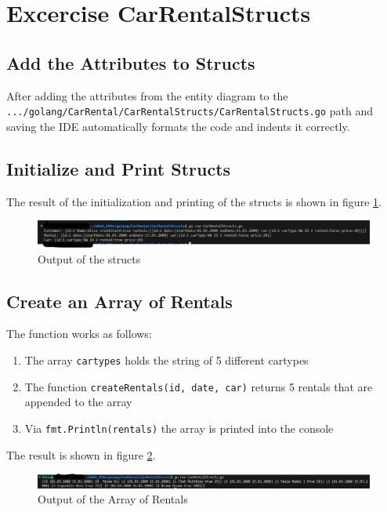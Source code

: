 \section{Excercise CarRentalStructs}
\label{sec:car_rental_structs}

\subsection*{Add the Attributes to Structs}
After adding the attributes from the entity diagram to the 
\texttt{.../golang/CarRental/CarRentalStructs/CarRentalStructs.go} path and saving
the IDE automatically formats the code and indents it correctly.

\subsection*{Initialize and Print Structs}
The result of the initialization and printing of the structs is shown in figure \ref{fig:car_rental_structs}.
\begin{figure}[H]
    \centering
    \includegraphics[width=\textwidth]{figures/goLang/carRental/carRental_structs.png}
    \caption{Output of the structs}
    \label{fig:car_rental_structs}
\end{figure}

\subsection*{Create an Array of Rentals}
The function works as follows:
\begin{enumerate}
    \item The array \texttt{cartypes} holds the string of 5 different cartypes
    \item The function \texttt{createRentals(id, date, car)} returns 5 rentals that are appended to the array
    \item Via \texttt{fmt.Println(rentals)} the array is printed into the console
\end{enumerate}

The result is shown in figure \ref{fig:car_rental_array_five_rentals}.
\begin{figure}[H]
    \centering
    \includegraphics[width=\textwidth]{figures/goLang/carRental/carRental_arrayFiveRentals.png}
    \caption{Output of the Array of Rentals}
    \label{fig:car_rental_array_five_rentals}
\end{figure}

